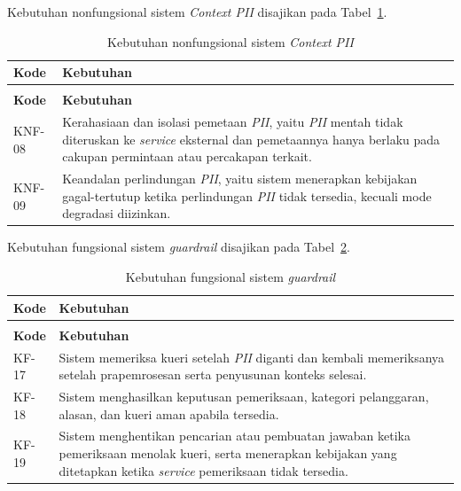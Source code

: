 \noindent Kebutuhan nonfungsional sistem \emph{Context PII} disajikan pada Tabel~\ref{tab:knf-context-pii}.

\begin{longtable}{>{\RaggedRight\arraybackslash}p{2.2cm} >{\RaggedRight\arraybackslash}p{10.65cm}}
    \caption{Kebutuhan nonfungsional sistem \emph{Context PII}}\label{tab:knf-context-pii}\\
    \toprule
    \textbf{Kode} & \textbf{Kebutuhan}\\
    \midrule
    \endfirsthead
    \multicolumn{2}{l}{\small\itshape Lanjutan Tabel \ref{tab:knf-context-pii}}\\
    \toprule
    \textbf{Kode} & \textbf{Kebutuhan}\\
    \midrule
    \endhead
    \bottomrule
    \endfoot
    KNF-08 & Kerahasiaan dan isolasi pemetaan \emph{PII}, yaitu \emph{PII} mentah tidak diteruskan ke \emph{service} eksternal dan pemetaannya hanya berlaku pada cakupan permintaan atau percakapan terkait.\\
    KNF-09 & Keandalan perlindungan \emph{PII}, yaitu sistem menerapkan kebijakan gagal-tertutup ketika perlindungan \emph{PII} tidak tersedia, kecuali mode degradasi diizinkan.\\
\end{longtable}

\noindent Kebutuhan fungsional sistem \emph{guardrail} disajikan pada Tabel~\ref{tab:kf-guardrail}.

\begin{longtable}{>{\RaggedRight\arraybackslash}p{2.2cm} >{\RaggedRight\arraybackslash}p{10.65cm}}
    \caption{Kebutuhan fungsional sistem \emph{guardrail}}\label{tab:kf-guardrail}\\
    \toprule
    \textbf{Kode} & \textbf{Kebutuhan}\\
    \midrule
    \endfirsthead
    \multicolumn{2}{l}{\small\itshape Lanjutan Tabel \ref{tab:kf-guardrail}}\\
    \toprule
    \textbf{Kode} & \textbf{Kebutuhan}\\
    \midrule
    \endhead
    \bottomrule
    \endfoot
    KF-17 & Sistem memeriksa kueri setelah \emph{PII} diganti dan kembali memeriksanya setelah prapemrosesan serta penyusunan konteks selesai.\\
    KF-18 & Sistem menghasilkan keputusan pemeriksaan, kategori pelanggaran, alasan, dan kueri aman apabila tersedia.\\
    KF-19 & Sistem menghentikan pencarian atau pembuatan jawaban ketika pemeriksaan menolak kueri, serta menerapkan kebijakan yang ditetapkan ketika \emph{service} pemeriksaan tidak tersedia.\\
\end{longtable}

